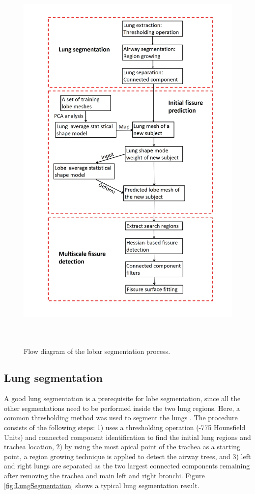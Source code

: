 \begin{figure}[H]
  \centering 
  \includegraphics[height=7.8in]{Segmentation/Image/WholeWorkflow.jpg}
  \caption{Flow diagram of the lobar segmentation process.}
  \label{fig:WholeWorkflow}
\end{figure}

\subsection{Lung segmentation} \label{subsection:LungSegmentation}
A good lung segmentation is a prerequisite for lobe segmentation, since all the other segmentations need to be performed inside the two lung regions. Here, a common thresholding method was used to segment the lungs \citep{ukil2005smoothing}. The procedure consists of the following steps: 1) uses a thresholding operation (-775 Hounsfield Units) and connected component identification to find the initial lung regions and trachea location, 2) by using the most apical point of the trachea as a starting point, a region growing technique is applied to detect the airway trees, and 3) left and right lungs are separated as the two largest connected components remaining after removing the trachea and main left and right bronchi. Figure \ref{fig:LungSegmentation} shows a typical lung segmentation result.

